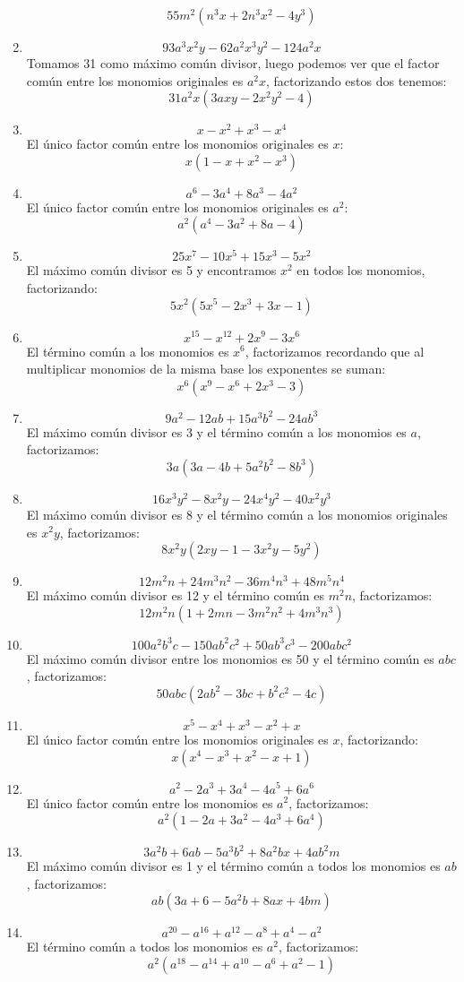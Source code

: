 \documentclass[12pt]{article}
\begin{document}
\begin{enumerate}[label=\bfseries Ejercicio \arabic*:]
$$55m^2(n^3x + 2 n^3x^2 - 4y^3)$$
  \item $$93a^3x^2y - 62a^2x^3y^2 - 124a^2x$$
Tomamos 31 como máximo común divisor, luego podemos ver que el factor común entre los monomios originales es $a^2x$, factorizando estos dos tenemos:
$$31a^2x(3axy - 2x^2y^2 - 4)$$
  \item $$x - x^2 + x^3 - x^4$$
El único factor común entre los monomios originales es $x$:
$$x(1 - x + x^2 - x^3)$$
  \item $$a^6 - 3a^4 + 8a^3 - 4a^2$$
El único factor común entre los monomios originales es $a^2$:
$$a^2(a^4 - 3a^2 + 8a - 4)$$
  \item $$25x^7 - 10x^5 + 15x^3 - 5x^2$$
El máximo común divisor es 5 y encontramos $x^2$ en todos los monomios, factorizando:
$$5x^2(5x^5 -2x^3 + 3x -1)$$
  \item $$x^{15} - x^{12} + 2x^9 - 3x^6$$
El término común a los monomios es $x^6$, factorizamos recordando que al multiplicar monomios de la misma base los exponentes se suman:
$$x^6(x^9 - x^6 +2x^3 - 3)$$
  \item $$9a^2 - 12ab + 15a^3b^2 - 24 ab^3$$
El máximo común divisor es 3 y el término común a los monomios es $a$, factorizamos:
$$3a(3a - 4b + 5a^2b^2 - 8b^3)$$
  \item $$16x^3y^2 - 8x^2y -24x^4y^2 - 40x^2y^3$$
El máximo común divisor es 8 y el término común a los monomios originales es $x^2y$, factorizamos:
$$8x^2y(2xy - 1 - 3x^2y - 5y^2)$$
  \item $$12m^2n + 24m^3n^2 - 36m^4n^3 + 48m^5n^4$$
El máximo común divisor es 12 y el término común es $m^2n$, factorizamos:
$$12m^2n(1 + 2mn - 3m^2n^2 + 4m^3n^3)$$
  \item $$100a^2b^3c - 150ab^2c^2 + 50ab^3c^3 - 200abc^2$$
El máximo común divisor entre los monomios es 50 y el término común es $abc$, factorizamos:
$$50abc(2ab^2 - 3bc + b^2c^2 - 4c)$$
  \item $$x^5 - x^4 +x^3 - x^2 +x$$
El único factor común entre los monomios originales es $x$, factorizando:
$$x(x^4 - x^3 + x^2 -x + 1)$$
  \item $$a^2 - 2a^3 + 3a^4 - 4a^5 + 6a^6$$
El único factor común entre los monomios es $a^2$, factorizamos:
$$a^2(1 - 2a + 3a^2 - 4a^3 + 6a^4)$$
  \item $$3a^2b + 6ab - 5a^3b^2 + 8a^2bx + 4ab^2m$$
El máximo común divisor es 1 y el término común a todos los monomios es $ab$, factorizamos:
$$ab(3a + 6 -5a^2b + 8ax + 4bm)$$
  \item $$a^{20} - a^{16} + a^{12} - a^8 + a^4 -a^2$$
El término común a todos los monomios es $a^2$, factorizamos:
$$a^2(a^{18} - a^{14} + a^{10} - a^6 + a^2 -1)$$
\end{enumerate}
\end{document}
